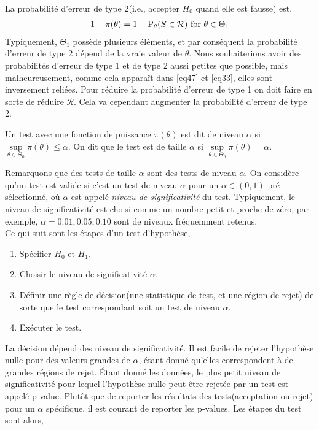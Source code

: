 La probabilité d'erreur de type 2(i.e., accepter $H_0$ quand elle est fausse) est,
\begin{align}
1 -\pi(\theta) = 1 - \Prob_\theta(S\in\mathcal{R}) \ \textrm{for} \ \theta\in \Theta_1
\label{eq33}
\end{align}
Typiquement, $\Theta_1$ possède plusieurs éléments, et par conséquent la probabilité d'erreur de type 2 dépend de la vraie valeur de $\theta$. Nous souhaiterions avoir des probabilités d'erreur de type 1 et de type 2 aussi petites que possible, mais malheureusement, comme cela apparaît dans \eqref{eq47} et \eqref{eq33}, elles sont inversement reliées. Pour réduire la probabilité d'erreur de type 1 on doit faire en sorte de réduire $\mathcal{R}$. Cela va cependant augmenter la probabilité d'erreur de type 2.
\begin{definition}
Un test avec une fonction de puissance $\pi(\theta)$ est dit de niveau $\alpha$ si $\underset{\theta\in\Theta_0}{\sup} \pi(\theta) \leq \alpha$. On dit que le test est de taille $\alpha$ si $\underset{\theta\in\Theta_0}{\sup} \pi(\theta) = \alpha$.
\label{de1}
\end{definition} 
Remarquons que des tests de taille $\alpha$ sont des tests de niveau $\alpha$. On considère qu'un test est valide si c'est un test de niveau $\alpha$ pour un $\alpha\in (0,1)$ pré-sélectionné, où $\alpha$ est appelé \emph{niveau de significativité} du test. Typiquement, le niveau de significativité est choisi comme un nombre petit et proche de zéro, par exemple, $\alpha = 0.01, 0.05, 0.10$ sont de niveaux fréquemment  retenus.\\
Ce qui suit sont les étapes d'un test d'hypothèse,
\begin{enumerate}
\item Spécifier $H_0$ et $H_1$.
\item Choisir le niveau de significativité $\alpha$.
\item Définir une règle de décision(une statistique de test, et une région de rejet) de sorte que le test correspondant soit un test de niveau $\alpha$.
\item Exécuter le test.
\end{enumerate}
La décision dépend des niveau de significativité. Il est facile de rejeter l'hypothèse nulle pour des valeurs grandes de $\alpha$, étant donné qu'elles correspondent à de grandes régions de rejet. \'Etant donné les données, le plus petit niveau de significativité pour lequel l'hypothèse nulle peut être rejetée par un test est appelé p-value. Plutôt que de reporter les résultats des tests(acceptation ou rejet) pour un $\alpha$ spécifique, il est courant de reporter les p-values. Les étapes du test sont alors,

